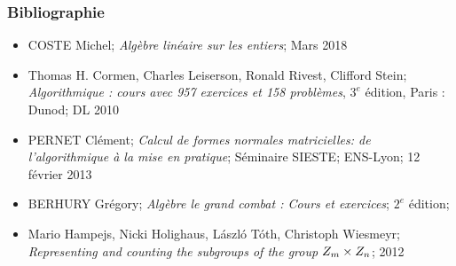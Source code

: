 \documentclass[10pt]{beamer}
\begin{document}
\begin{frame}
    \frametitle{Bibliographie}
    \begin{itemize}
        \item COSTE Michel; \textit{Algèbre linéaire sur les entiers}; Mars 2018
        \item Thomas H. Cormen, Charles Leiserson, Ronald Rivest, Clifford Stein;\\
              \textit{Algorithmique : cours avec 957 exercices et 158 problèmes}, $3^e$ édition, Paris : Dunod; DL 2010
        \item PERNET Clément; \textit{Calcul de formes normales matricielles: de
                  l'algorithmique à la mise en pratique}; Séminaire SIESTE; ENS-Lyon; 12 février 2013
        \item BERHURY Grégory; \textit{Algèbre le grand combat : Cours et exercices};
              $2^e$ édition;
        \item Mario Hampejs, Nicki Holighaus, László Tóth, Christoph Wiesmeyr;\\
              \textit{Representing and counting the subgroups of the group $Z_m \times Z_n$}; 2012
    \end{itemize}
\end{frame}
\end{document}
